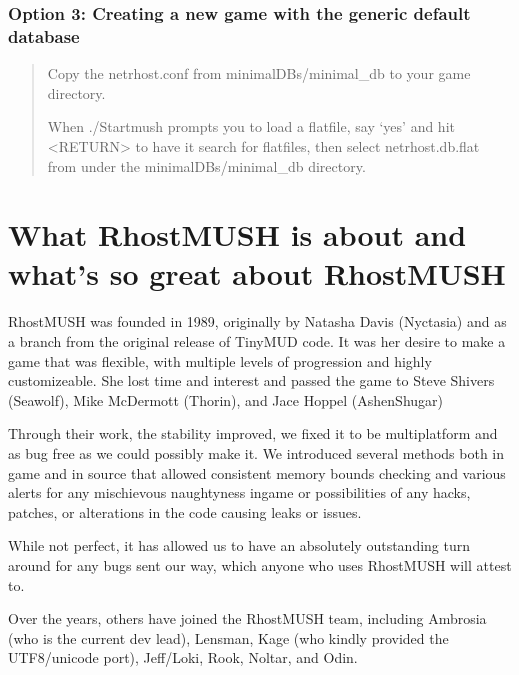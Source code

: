 \documentclass[letterpaper,10pt,english]{sphinxmanual}
\begin{document}
\subsection{Option 3: Creating a new game with the generic default database}
\label{\detokenize{install:option-3-creating-a-new-game-with-the-generic-default-database}}\begin{quote}

\sphinxAtStartPar
Copy the netrhost.conf from minimal\sphinxhyphen{}DBs/minimal\_db to your game directory.

\sphinxAtStartPar
When ./Startmush prompts you to load a flatfile, say ‘yes’ and hit \textless{}RETURN\textgreater{}
to have it search for flatfiles, then select netrhost.db.flat from under
the minimal\sphinxhyphen{}DBs/minimal\_db directory.
\end{quote}


\chapter{What RhostMUSH is about and what’s so great about RhostMUSH}
\label{\detokenize{features:what-rhostmush-is-about-and-what-s-so-great-about-rhostmush}}\label{\detokenize{features::doc}}
\sphinxAtStartPar
RhostMUSH was founded in 1989, originally by Natasha Davis (Nyctasia) and as
a branch from the original release of TinyMUD code.  It was her desire to make
a game that was flexible, with multiple levels of progression and highly
customizeable.  She lost time and interest and passed the game to
Steve Shivers (Seawolf), Mike McDermott (Thorin), and Jace Hoppel (Ashen\sphinxhyphen{}Shugar)

\sphinxAtStartPar
Through their work, the stability improved, we fixed it to be multi\sphinxhyphen{}platform
and as bug free as we could possibly make it.  We introduced several methods both
in game and in source that allowed consistent memory bounds checking and
various alerts for any mischievous naughtyness in\sphinxhyphen{}game or possibilities of any
hacks, patches, or alterations in the code causing leaks or issues.

\sphinxAtStartPar
While not perfect, it has allowed us to have an absolutely outstanding
turn around for any bugs sent our way, which anyone who uses RhostMUSH will
attest to.

\sphinxAtStartPar
Over the years, others have joined the RhostMUSH team, including Ambrosia
(who is the current dev lead), Lensman, Kage (who kindly provided the
UTF8/unicode port), Jeff/Loki, Rook, Noltar, and Odin.
\end{document}
